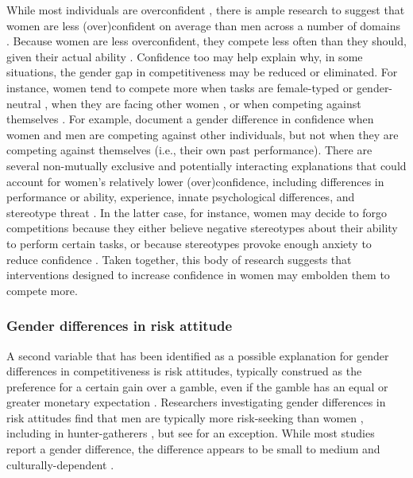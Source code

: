 \documentclass[letterpaper, nobind]{templates/ociamthesis}
\begin{document}
While most individuals are overconfident \autocite{Alicke2013,Dunning2004b}, there is ample research to suggest that women are less (over)confident on average than men across a number of domains \autocites{Mobius2011,Niederle2011,Croson2009,Lundeberg1994,Niederle2007,Bertrand2010a,Beyer1990,Beyer1997,Jakobsson2013}[although see][]{Bandiera2022}. Because women are less overconfident, they compete less often than they should, given their actual ability \autocite{Niederle2007}. Confidence too may help explain why, in some situations, the gender gap in competitiveness may be reduced or eliminated. For instance, women tend to compete more when tasks are female-typed or gender-neutral \autocite{Iriberri2017,Boschini2014,Boschini2019,Apicella2015,Grosse2010,Gunther2010,Dreber2014,Dreber2011,Shurchkov2012}, when they are facing other women \autocite{DattaGupta2013,Booth2012}, or when competing against themselves \autocite{Apicella2017a,Bonte2018,Carpenter2018,Apicella2020}. For example, \textcite{Apicella2017a} document a gender difference in confidence when women and men are competing against other individuals, but not when they are competing against themselves (i.e., their own past performance). There are several non-mutually exclusive and potentially interacting explanations that could account for women's relatively lower (over)confidence, including differences in performance or ability, experience, innate psychological differences, and stereotype threat \autocite{Steele1997,Spencer1999,Spencer2016}. In the latter case, for instance, women may decide to forgo competitions because they either believe negative stereotypes about their ability to perform certain tasks, or because stereotypes provoke enough anxiety to reduce confidence \autocite{Gunther2010,Grosse2010,Iriberri2017,Shurchkov2012,Burow2017}. Taken together, this body of research suggests that interventions designed to increase confidence in women may embolden them to compete more.

\hypertarget{gender-differences-in-risk-attitude}{%
\subsubsection{Gender differences in risk attitude}\label{gender-differences-in-risk-attitude}}

A second variable that has been identified as a possible explanation for gender differences in competitiveness is risk attitudes, typically construed as the preference for a certain gain over a gamble, even if the gamble has an equal or greater monetary expectation \autocite{Kahneman1982}. Researchers investigating gender differences in risk attitudes find that men are typically more risk-seeking than women \autocite{Eckel2008,Charness2012,Croson2009,Bertrand2010a}, including in hunter-gatherers \autocite{Apicella2017}, but see \autocite{Harrison2007} for an exception. While most studies report a gender difference, the difference appears to be small to medium \autocite{Filippin2016} and culturally-dependent \autocite{Gneezy2009}.
\end{document}
